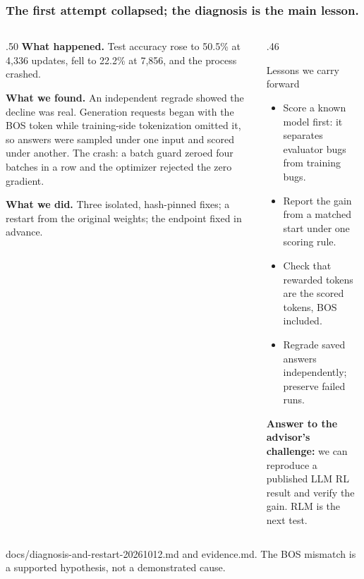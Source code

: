 \documentclass[aspectratio=169,11pt]{beamer}
\newcommand{\source}[1]{\vfill{\scriptsize\color{Gray}#1\par}}
\begin{document}
\begin{frame}[t]
\frametitle{The first attempt collapsed; the diagnosis is the main lesson.}
\small
\begin{columns}[T,onlytextwidth]
\begin{column}{.50\textwidth}
\textbf{What happened.} Test accuracy rose to 50.5\% at 4,336 updates, fell to
\alert{22.2\%} at 7,856, and the process crashed.
\medskip

\textbf{What we found.} An independent regrade showed the decline was real. Generation
requests began with the BOS token while training-side tokenization omitted it, so answers
were sampled under one input and scored under another. The crash: a batch guard zeroed four
batches in a row and the optimizer rejected the zero gradient.
\medskip

\textbf{What we did.} Three isolated, hash-pinned fixes; a restart from the original
weights; the endpoint fixed in advance.
\end{column}
\begin{column}{.46\textwidth}
\begin{block}{Lessons we carry forward}
\begin{itemize}\setlength{\itemsep}{1pt}
\item Score a known model first: it separates evaluator bugs from training bugs.
\item Report the gain from a matched start under one scoring rule.
\item Check that rewarded tokens are the scored tokens, BOS included.
\item Regrade saved answers independently; preserve failed runs.
\end{itemize}
\end{block}
\textbf{Answer to the advisor's challenge:} we can reproduce a published LLM RL result and
verify the gain. RLM is the next test.
\end{column}
\end{columns}
\source{docs/diagnosis-and-restart-20261012.md and evidence.md. The BOS mismatch is a supported hypothesis, not a demonstrated cause.}
\end{frame}
\end{document}

